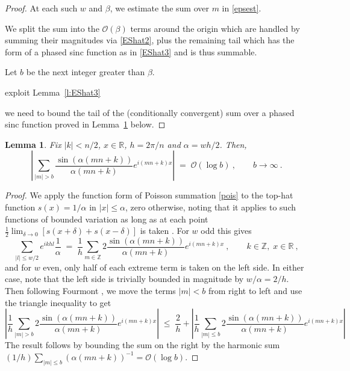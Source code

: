 \documentclass[10pt]{article}
\newcommand{\be}{\begin{equation}}
\newcommand{\ee}{\end{equation}}
\newcommand{\RR}{\mathbb{R}}
\newcommand{\ZZ}{\mathbb{Z}}
\newcommand{\bigO}{{\mathcal O}}
\newtheorem{lem}[thm]{Lemma}
\newcommand{\freq}{\beta}          %
\newcommand{\al}{\alpha}           %
\begin{document}
\begin{proof}


At each such $w$ and $\freq$, we estimate the sum over $m$ in \eqref{epsest}.



  
  We split the sum into the $\bigO(\freq)$ terms around the origin
  which are handled by summing their magnitudes via \eqref{EShat2},
  plus the remaining tail which has the form of a phased sinc function
  as in \eqref{EShat3} and is thus summable.
  
  Let $b$ be the next integer greater than $\freq$.
  
 exploit Lemma~\ref{l:EShat3}
  
we need to bound the tail of the (conditionally convergent) sum over a phased sinc function proved in Lemma~\ref{l:Fourmont} below.
  
  \end{proof}


\begin{lem}
  Fix $|k|<n/2$, $x\in\RR$, $h=2\pi/n$ and $\al=wh/2$. Then,
  \be
  \left|
  \sum_{|m|>b} \frac{\sin (\al (mn+k))}{\al (mn+k)} e^{i(mn+k)x}
  \right|
  \; = \; \bigO(\log b)~, \qquad b\to \infty ~.
\ee
\label{l:Fourmont}
\end{lem}
\begin{proof}
  We apply the function form of Poisson summation \eqref{pois} to
  the top-hat function $s(x) = 1/\al$ in $|x|\le \al$, zero otherwise,
  noting that it applies to such functions of bounded variation
  as long as at each
  point $\frac{1}{2}\lim_{\delta\to0} [s(x+\delta) + s(x-\delta)]$ is taken
  \cite[\S 11.22]{apostol}.
  For $w$ odd this gives
  $$
  \sum_{|l|\le w/2} e^{ikhl} \frac{1}{\al}
  \;=\;
  \frac{1}{h} \sum_{m\in\ZZ} 2 \frac{\sin (\al (mn+k))}{\al (mn+k)} e^{i(mn+k)x}
  ~,\qquad k\in\ZZ, \; x\in\RR~,
  $$
  and for $w$ even, only half of each extreme term is taken on the left side.
  In either case, note that the left side is
  trivially bounded in magnitude by $w/\al = 2/h$.
  Then following Fourmont \cite[Lemma~2.5.4]{fourmontthesis},
  we move the terms $|m|<b$ from right to left and use the triangle inequality
  to get
  $$
  \left|
  \frac{1}{h} \sum_{|m|> b} 2 \frac{\sin (\al (mn+k))}{\al (mn+k)} e^{i(mn+k)x}
  \right|
  \; \le \; \frac{2}{h} +
  \left|
  \frac{1}{h} \sum_{|m|\le b} 2 \frac{\sin (\al (mn+k))}{\al (mn+k)} e^{i(mn+k)x}
  \right|
   $$
  The result follows by bounding the sum on the right by the
  harmonic sum $(1/h) \sum_{|m|\le b} (\al(mn+k))^{-1} = \bigO(\log b)$.
\end{proof}
\end{document}
